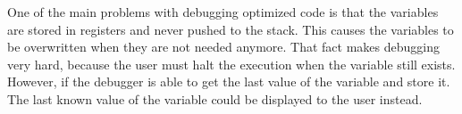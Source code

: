 One of the main problems with debugging optimized code is that the variables are stored in registers and never pushed to the stack.
This causes the variables to be overwritten when they are not needed anymore.
That fact makes debugging very hard, because the user must halt the execution when the variable still exists.
However, if the debugger is able to get the last value of the variable and store it.
The last known value of the variable could be displayed to the user instead.




